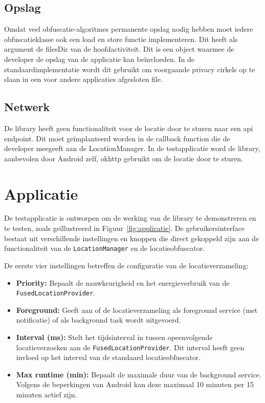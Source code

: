 \subsection{Opslag}
Omdat veel obfuscatie-algoritmes permanente opslag nodig hebben moet iedere obfuscatieklasse ook een load en store functie implementeren. Dit heeft als argument de filesDir van de hoofdactiviteit. Dit is een object waarmee de developer de opslag van de applicatie kan beïnvloeden. In de standaardimplementatie wordt dit gebruikt om voorgaande privacy cirkels op te slaan in een voor andere applicaties afgesloten file. \cite{android_opslag}
\subsection{Netwerk}
De library heeft geen functionaliteit voor de locatie door te sturen naar een \gls{api} endpoint. Dit moet geïmplanteerd worden in de callback function die de developer meegeeft aan de LocationManager. In de testapplicatie word de library, aanbevolen door Android zelf, okhttp gebruikt om de locatie door te sturen.

\section{Applicatie}
De testapplicatie is ontworpen om de werking van de library te demonstreren en te testen, zoals geïllustreerd in Figuur~\ref{fig:applicatie}. De gebruikersinterface bestaat uit verschillende instellingen en knoppen die direct gekoppeld zijn aan de functionaliteit van de \texttt{LocationManager} en de locatieobfuscator.

De eerste vier instellingen betreffen de configuratie van de locatieverzameling:
\begin{itemize}
    \item \textbf{Priority:} Bepaalt de nauwkeurigheid en het energieverbruik van de \texttt{FusedLocationProvider}.
    \item \textbf{Foreground:} Geeft aan of de locatieverzameling als foreground service (met notificatie) of als background task wordt uitgevoerd.
    \item \textbf{Interval (ms):} Stelt het tijdsinterval in tussen opeenvolgende locatieverzoeken aan de \texttt{FusedLocationProvider}. Dit interval heeft geen invloed op het interval van de standaard locatieobfuscator.
    \item \textbf{Max runtime (min):} Bepaalt de maximale duur van de background service. Volgens de beperkingen van Android kan deze maximaal 10 minuten per 15 minuten actief zijn.
\end{itemize}

